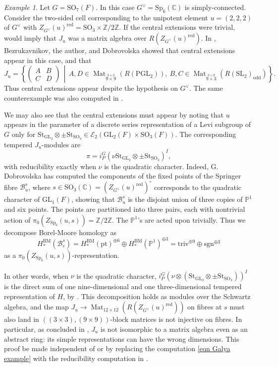 \documentclass[10pt]{article}
\newcommand{\sets}[2]{\left\{#1\,\middle|\,#2\right\}}
\DeclareMathOperator{\Mat}{Mat}
\newcommand{\Pp}{\mathbb{P}}
\newcommand{\Bb}{\mathcal{B}}
\newcommand{\pt}{\mathrm{pt}}
\newcommand{\Ee}{\mathcal{E}}
\newcommand{\Z}{\mathbb{Z}}
\newcommand{\C}{\mathbb{C}}
\newcommand{\GL}{\mathrm{GL}}
\newcommand{\PGL}{\mathrm{PGL}}
\newcommand{\SL}{\mathrm{SL}}
\newcommand{\SO}{\mathrm{SO}}
\newcommand{\Sp}{\mathrm{Sp}}
\newcommand{\St}{\mathrm{St}}
\newcommand{\triv}{\mathrm{triv}}
\theoremstyle{definition}
\theoremstyle{remark}
\newtheorem{ex}{Example}
\newcommand{\Zur}{Z_{G^\vee}(u)^{\mathrm{red}}}
\begin{document}
%
\begin{ex}
\label{ex BDD central ext}
Let $G=\SO_7(F)$. In this case $G^\vee=\Sp_6(\C)$ is simply-connected. Consider the two-sided 
cell corresponding to the unipotent element $u=(2,2,2)$ of $G^\vee$ with $\Zur=\SO_3\times\Z/2\Z$.
If the central extensions were trivial, \cite{BO} would imply that $J_u$ 
was a matrix algebra over $R(\Zur)$. In \cite[Theorem 5]{BDD},
Bezrukavnikov, the author, and Dobrovolska showed that central extensions appear in this case, and that
%
\[
J_u
=
\sets{
\begin{pmatrix}
A & B\\
C &D
\end{pmatrix}
}{A,D\in\Mat_{\overset{3\times 3}{9\times 9}}\left(R(\PGL_2)\right),~B,C\in\Mat_{\overset{3\times 9}{9\times 3}}\left(R(\SL_2)_{\mathrm{odd}}\right)}.
\]
%
Thus central extensions appear despite the hypothesis on $G^\vee$. The same counterexample
was also computed in \cite{QX}.

We may also see that the central extensions must appear by noting 
that $u$ appears in the parameter of a discrete series representation
of a Levi subgroup of $G$ only for
$\St_{\GL_2}\otimes\pm\St_{\SO_3}\in\Ee_2(\GL_2(F)\times\SO_3(F))$.
The corresponding tempered $J_u$-modules are
%
\[
\pi=i_P^G(\nu\St_{\GL_2}\otimes\pm\St_{\SO_3})^I,
\]
%
with reducibility exactly when $\nu$ is the quadratic character. Indeed, G. Dobrovolska has
computed the components of the fixed points of the Springer fibre
$\Bb_u^s$, where $s\in\SO_3(\C)=\left(\Zur\right)^\circ$ corresponds to the quadratic character of 
$\GL_1(F)$, showing that $\Bb_u^s$ is the disjoint union of three copies of $\Pp^1$ and six points.
The points are partitioned into three pairs, each with nontrivial action of
$\pi_0(Z_{\Sp_6}(u,s))=\Z/2\Z$. The $\Pp^1$'s are acted upon trivially. Thus we decompose 
Borel-Moore homology as
%
\begin{equation}
\label{eqn Galya example}
H_*^{\mathrm{BM}}(\Bb_e^s)=H_*^{\mathrm{BM}}(\pt)^{\oplus 6}\oplus H_*^{\mathrm{BM}}(\Pp^1)^{\oplus 3}
=\triv^{\oplus 9}\oplus\mathrm{sgn}^{\oplus 3}
\end{equation}
%
as a $\pi_0(Z_{\Sp_6}(u,s))$-representation.

In other words, when $\nu$ is the quadratic character, 
$i_P^G(\nu\otimes(\St_{\GL_2}\otimes\pm\St_{\SO_3}))^I$
is the direct sum of one nine-dimensional and one three-dimensional tempered representation of $H$, by 
\cite{KLDeligneLanglands}. This decomposition holds as modules over the Schwartz algebra, and the map 
$J_u\to\Mat_{12\times 12}(R(\Zur))$ on fibres at $s$ must also land in 
$((3\times 3), (9\times 9))$-block matrices is not injective on fibres. In particular, as concluded in \cite{BDD}, $J_u$ is not isomorphic to a matrix algebra even as an abstract 
ring: its simple representations can have the wrong dimensions.
This proof be made independent of \cite{BDD} or \cite{QX} 
by replacing the computation \eqref{eqn Galya example} with the reducibility computation
in \cite[Theorem 5.2(v)]{Zoric}.
%
\end{ex}
%
\end{document}
